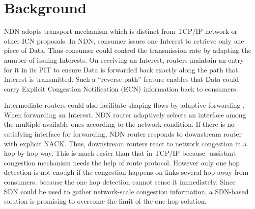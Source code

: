 
\section{Background}

\label{sec:bg}


NDN adopts transport mechanism \cite{NDN, Adaptive} which is distinct from TCP/IP network or other ICN proposals. In NDN, consumer issues one Interest to retrieve only one piece of Data. Thus consumer could control the transmission rate by adapting the number of issuing Interests. On receiving an Interest, routers maintain an entry for it in its PIT to ensure Data is forwarded back exactly along the path that Interest is transmitted. Such a ``reverse path'' feature enables that Data could carry Explicit Congestion Notification (ECN) information back to consumers.

Intermediate routers could also facilitate shaping flows by adaptive forwarding \cite{Adaptive}. When forwarding an Interest, NDN router adaptively selects an interface among the multiple available ones according to the network condition. If there is no satisfying interface for forwarding, NDN router responds to downstream router with explicit NACK. Thus, downstream routers react to network congestion in a hop-by-hop way. This is much easier than that in TCP/IP because -assistant congestion mechanism needs the help of route protocol\cite{selfish}. However only one hop detection is not enough if the congestion happens on links several hop away from consumers, because the one hop detection cannot sense it immediately. Since SDN\cite{SDN} could be used to gather network-scale congestion information, a SDN-based solution is promising to overcome the limit of the one-hop solution.



